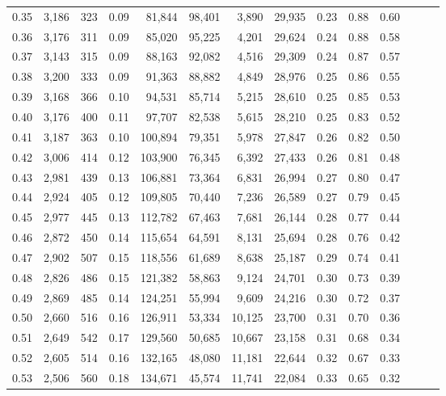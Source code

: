\begin{tabular}{rrrrrrrrrrrrrr}
0.35 &  3,186 &  323 &  0.09 &   81,844 &   98,401 &   3,890 &  29,935 &  0.23 &  0.88 &      0.60 \\
0.36 &  3,176 &  311 &  0.09 &   85,020 &   95,225 &   4,201 &  29,624 &  0.24 &  0.88 &      0.58 \\
0.37 &  3,143 &  315 &  0.09 &   88,163 &   92,082 &   4,516 &  29,309 &  0.24 &  0.87 &      0.57 \\
0.38 &  3,200 &  333 &  0.09 &   91,363 &   88,882 &   4,849 &  28,976 &  0.25 &  0.86 &      0.55 \\
0.39 &  3,168 &  366 &  0.10 &   94,531 &   85,714 &   5,215 &  28,610 &  0.25 &  0.85 &      0.53 \\
0.40 &  3,176 &  400 &  0.11 &   97,707 &   82,538 &   5,615 &  28,210 &  0.25 &  0.83 &      0.52 \\
0.41 &  3,187 &  363 &  0.10 &  100,894 &   79,351 &   5,978 &  27,847 &  0.26 &  0.82 &      0.50 \\
0.42 &  3,006 &  414 &  0.12 &  103,900 &   76,345 &   6,392 &  27,433 &  0.26 &  0.81 &      0.48 \\
0.43 &  2,981 &  439 &  0.13 &  106,881 &   73,364 &   6,831 &  26,994 &  0.27 &  0.80 &      0.47 \\
0.44 &  2,924 &  405 &  0.12 &  109,805 &   70,440 &   7,236 &  26,589 &  0.27 &  0.79 &      0.45 \\
0.45 &  2,977 &  445 &  0.13 &  112,782 &   67,463 &   7,681 &  26,144 &  0.28 &  0.77 &      0.44 \\
0.46 &  2,872 &  450 &  0.14 &  115,654 &   64,591 &   8,131 &  25,694 &  0.28 &  0.76 &      0.42 \\
0.47 &  2,902 &  507 &  0.15 &  118,556 &   61,689 &   8,638 &  25,187 &  0.29 &  0.74 &      0.41 \\
0.48 &  2,826 &  486 &  0.15 &  121,382 &   58,863 &   9,124 &  24,701 &  0.30 &  0.73 &      0.39 \\
0.49 &  2,869 &  485 &  0.14 &  124,251 &   55,994 &   9,609 &  24,216 &  0.30 &  0.72 &      0.37 \\
0.50 &  2,660 &  516 &  0.16 &  126,911 &   53,334 &  10,125 &  23,700 &  0.31 &  0.70 &      0.36 \\
0.51 &  2,649 &  542 &  0.17 &  129,560 &   50,685 &  10,667 &  23,158 &  0.31 &  0.68 &      0.34 \\
0.52 &  2,605 &  514 &  0.16 &  132,165 &   48,080 &  11,181 &  22,644 &  0.32 &  0.67 &      0.33 \\
0.53 &  2,506 &  560 &  0.18 &  134,671 &   45,574 &  11,741 &  22,084 &  0.33 &  0.65 &      0.32 \\

\end{tabular}
